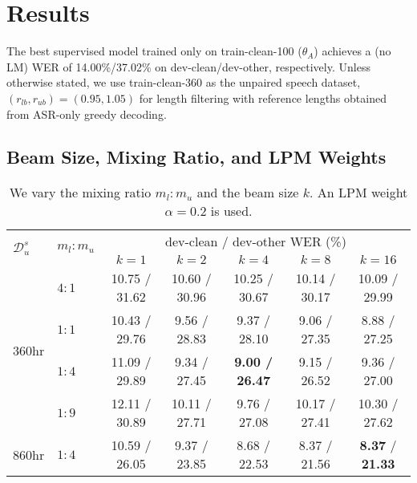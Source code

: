 \section{Results}

The best supervised model trained only on train-clean-100 ($\theta_A$) achieves a (no LM) WER of 14.00\%/37.02\% on dev-clean/dev-other, respectively.
Unless otherwise stated, we use train-clean-360 as the unpaired speech dataset, $(r_{lb}, r_{ub}) = (0.95, 1.05)$ for length filtering with reference lengths obtained from ASR-only greedy decoding.

\subsection{Beam Size, Mixing Ratio, and LPM Weights}

\begin{table*}[ht]
    \small
    \caption{We vary the mixing ratio $m_l : m_u$ and the beam size $k$. An LPM weight $\alpha\!=\!0.2$ is used.}
    \label{tab:beam}
    \begin{center}
    \begin{tabular}{llccccc}
        \toprule
        \multirow{2}{*}{$\mathcal{D}_u^s$} & \multirow{2}{*}{$m_l : m_u$} & 
        \multicolumn{5}{c}{dev-clean / dev-other WER (\%)} \\
        & & $k=1$ & $k=2$ & $k=4$ & $k=8$ & $k=16$ \\ 
        \midrule
        \multirow{4}{*}{360hr}
        & $4:1$ & 10.75 / 31.62 & 10.60 / 30.96 & 10.25 / 30.67 & 10.14 / 30.17 & 10.09 / 29.99 \\
        & $1:1$ & 10.43 / 29.76 &  9.56 / 28.83 &  9.37 / 28.10 &  9.06 / 27.35 &  8.88 / 27.25 \\
        & $1:4$ & 11.09 / 29.89 &  9.34 / 27.45 &  \textbf{9.00 / 26.47} &  9.15 / 26.52 &  9.36 / 27.00 \\
        & $1:9$ & 12.11 / 30.89 & 10.11 / 27.71 &  9.76 / 27.08 & 10.17 / 27.41 & 10.30 / 27.62 \\
        \midrule
        860hr & $1:4$ & 10.59 / 26.05 & 9.37 / 23.85 & 8.68 / 22.53 & 8.37 / 21.56 & \textbf{8.37} / \textbf{21.33} \\
        \bottomrule
    \end{tabular}
    \end{center}
\end{table*}

